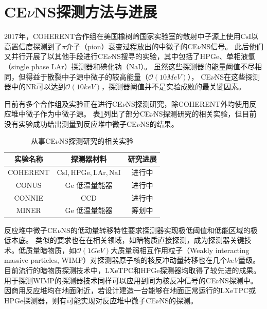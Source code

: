 \section{CE$\nu$NS探测方法与进展}

2017年，COHERENT合作组在美国橡树岭国家实验室的散射中子源上使用$\mathrm{CsI}$以高置信度探测到了$\pi$介子（pion）衰变过程放出的中微子的CE$\nu$NS信号\cite{akimov_observation_2017}。
此后他们又并行开展了以其他手段进行CE$\nu$NS搜寻的实验，其中包括了HPGe、单相液氩（single phase LAr）探测器和碘化钠（$\mathrm{NaI}$）。
虽然这些探测器的能量阈值不尽相同，但得益于散裂中子源中微子的较高能量（$\mathcal{O}\left(10\si{MeV}\right)$），
CE$\nu$NS在这些探测器中的NR可以达到$\mathcal{O}\left(10\si{keV}\right)$，探测器阈值并不是实验成败的最关键因素。

目前有多个合作组及实验正在进行CE$\nu$NS探测研究，除COHERENT外均使用反应堆中微子作为中微子源。
表\ref{tab:experiments}列出了部分CE$\nu$NS探测研究的相关实验，但目前没有实验成功给出测量到反应堆中微子CE$\nu$NS的结果。

\begin{table}
  \centering
  \caption{从事CE$\nu$NS探测研究的相关实验}
  \begin{tabular}{ccc}
    \toprule
    实验名称 & 探测器材料 & 研究进展 \\
    \midrule
    COHERENT & $\mathrm{CsI,HPGe,LAr,NaI}$ & 进行中\cite{coherent_collaboration_monitoring_2022} \\
    CONUS & $\mathrm{Ge}$ 低温量能器 & 进行中\cite{conus_collaboration_novel_2021} \\
    CONNIE & $\mathrm{CCD}$ & 进行中\cite{connie_collaboration_search_2022} \\
    MINER & $\mathrm{Ge}$ 低温量能器 & 筹划中\cite{agnolet_background_2017} \\
    \bottomrule
  \end{tabular}
  \label{tab:experiments}
\end{table}

反应堆中微子CE$\nu$NS的低动量转移特性要求探测器实现极低阈值和低能区域的极低本底。
类似的要求也在在相关领域，如暗物质直接探测，成为探测器关键技术。低质量暗物质，如$\mathcal{O}\left(1\si{GeV}\right)$大质量弱相互作用粒子（Weakly interacting massive particles, WIMP）对探测器原子核的核反冲动量转移也在几个$\si{keV}$量级。
目前流行的暗物质探测技术中，LXeTPC和HPGe探测器均取得了较先进的成果。用于探测WIMP的探测器技术同样可以应用到同为核反冲信号的CE$\nu$NS探测中。
因商用反应堆均在地面附近，若设计建造一台能够在地面正常运行的LXeTPC或HPGe探测器，则有可能实现对反应堆中微子CE$\nu$NS的探测。

